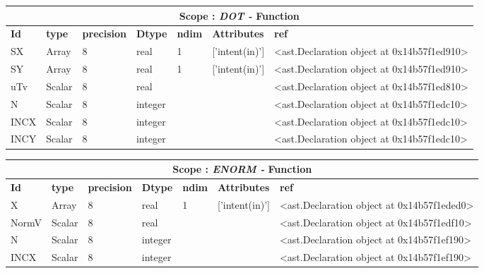 \documentclass{report}
\begin{document}
 \vspace{1cm}

\begin{center}
\begin{longtable}{|p{3.5cm}|p{1.5cm}|p{1.5cm}|p{1.5cm}|p{1cm}|p{2cm}|p{4cm}| }
\hline
\multicolumn{7}{|c|}{\textbf{Scope : \qquad}  \textbf{\textit{DOT - }Function}}\\ 
\hline
\textbf{Id} & \textbf{type} & \textbf{precision} & \textbf{Dtype} & \textbf{ndim} & \textbf{Attributes} & \textbf{ref} \\\hline

SX & Array & 8 & real & 1 & ['intent(in)'] & <ast.Declaration object at 0x14b57f1ed910> \\\hline

SY & Array & 8 & real & 1 & ['intent(in)'] & <ast.Declaration object at 0x14b57f1ed910> \\\hline

uTv & Scalar & 8 & real &  &  & <ast.Declaration object at 0x14b57f1ed810> \\\hline

N & Scalar & 8 & integer &  &  & <ast.Declaration object at 0x14b57f1edc10> \\\hline

INCX & Scalar & 8 & integer &  &  & <ast.Declaration object at 0x14b57f1edc10> \\\hline

INCY & Scalar & 8 & integer &  &  & <ast.Declaration object at 0x14b57f1edc10> \\\hline

\end{longtable}
\end{center}

 \vspace{1cm}

\begin{center}
\begin{longtable}{|p{3.5cm}|p{1.5cm}|p{1.5cm}|p{1.5cm}|p{1cm}|p{2cm}|p{4cm}| }
\hline
\multicolumn{7}{|c|}{\textbf{Scope : \qquad}  \textbf{\textit{ENORM - }Function}}\\ 
\hline
\textbf{Id} & \textbf{type} & \textbf{precision} & \textbf{Dtype} & \textbf{ndim} & \textbf{Attributes} & \textbf{ref} \\\hline

X & Array & 8 & real & 1 & ['intent(in)'] & <ast.Declaration object at 0x14b57f1eded0> \\\hline

NormV & Scalar & 8 & real &  &  & <ast.Declaration object at 0x14b57f1edf10> \\\hline

N & Scalar & 8 & integer &  &  & <ast.Declaration object at 0x14b57f1ef190> \\\hline

INCX & Scalar & 8 & integer &  &  & <ast.Declaration object at 0x14b57f1ef190> \\\hline

\end{longtable}
\end{center}
\end{document}
